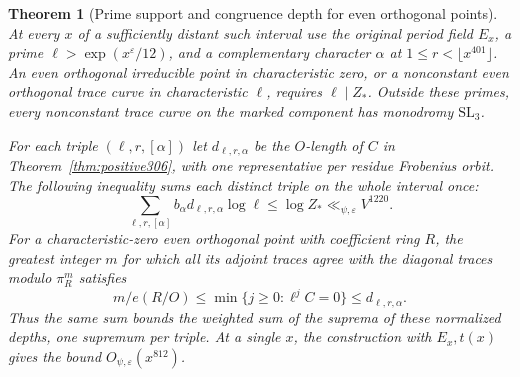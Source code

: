 \documentclass[a4paper,11pt]{article}
\newtheorem{theorem}[proposition]{Theorem}
\theoremstyle{definition}
\theoremstyle{remark}
\numberwithin{equation}{section}
\begin{document}
\begin{theorem}[Prime support and congruence depth for even orthogonal points]\leavevmode
\label{thm:evenbudget306}
At every \(x\) of a sufficiently distant such interval use the
original period field \(E_x\), a prime
\(\ell>\exp(x^\varepsilon/12)\), and a complementary character
\(\alpha\) at \(1\le r<\lfloor x^{401}\rfloor\).
An even orthogonal irreducible point in characteristic zero,
or a nonconstant even orthogonal trace curve in characteristic
\(\ell\), requires \(\ell\mid Z_*\).
Outside these primes, every nonconstant trace curve on the
marked component has monodromy \(\mathrm{SL}_3\).

For each triple \((\ell,r,[\alpha])\) let \(d_{\ell,r,\alpha}\)
be the \(O\)-length of \(C\) in Theorem~\ref{thm:positive306},
with one representative per residue Frobenius orbit.
The following inequality sums each distinct triple on the
whole interval once:
\[
 \sum_{\ell,r,[\alpha]} b_\alpha d_{\ell,r,\alpha}\log\ell
      \le \log Z_*\ll_{\psi,\varepsilon} V^{1220}.
\]
For a characteristic-zero even orthogonal point with coefficient
ring \(R\), the greatest integer \(m\) for which all its adjoint
traces agree with the diagonal traces modulo \(\pi_R^m\)
satisfies
\[
      m/e(R/O)\le \min\{j\ge0:\ell^j C=0\}
                   \le d_{\ell,r,\alpha}.
\]
Thus the same sum bounds the weighted sum of the suprema of
these normalized depths, one supremum per triple. At a single
\(x\), the construction with \(E_x,t(x)\) gives the bound
\(O_{\psi,\varepsilon}(x^{812})\).
\end{theorem}
\end{document}
